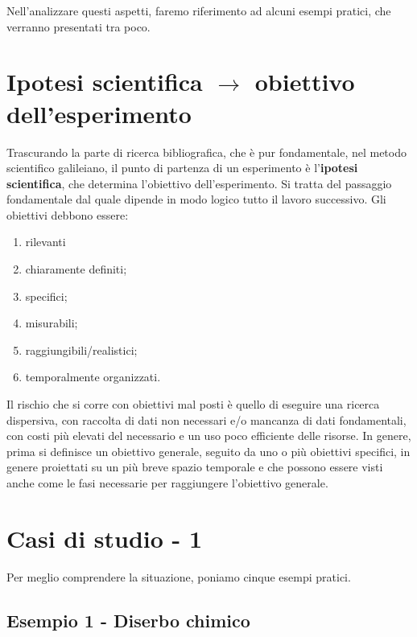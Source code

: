 \documentclass[a4paper,12pt,oneside]{book}
\providecommand{\tightlist}{%
  \setlength{\itemsep}{0pt}\setlength{\parskip}{0pt}}
\theoremstyle{definition}
\theoremstyle{definition}
\theoremstyle{definition}
\theoremstyle{remark}
\begin{document}
Nell'analizzare questi aspetti, faremo riferimento ad alcuni esempi
pratici, che verranno presentati tra poco.

\section{\texorpdfstring{Ipotesi scientifica \(\rightarrow\) obiettivo
dell'esperimento}{Ipotesi scientifica \textbackslash{}rightarrow obiettivo dell'esperimento}}\label{ipotesi-scientifica-rightarrow-obiettivo-dellesperimento}

Trascurando la parte di ricerca bibliografica, che è pur fondamentale,
nel metodo scientifico galileiano, il punto di partenza di un
esperimento è l'\textbf{ipotesi scientifica}, che determina l'obiettivo
dell'esperimento. Si tratta del passaggio fondamentale dal quale dipende
in modo logico tutto il lavoro successivo. Gli obiettivi debbono essere:

\begin{enumerate}
\def\labelenumi{\arabic{enumi}.}
\tightlist
\item
  rilevanti
\item
  chiaramente definiti;
\item
  specifici;
\item
  misurabili;
\item
  raggiungibili/realistici;
\item
  temporalmente organizzati.
\end{enumerate}

Il rischio che si corre con obiettivi mal posti è quello di eseguire una
ricerca dispersiva, con raccolta di dati non necessari e/o mancanza di
dati fondamentali, con costi più elevati del necessario e un uso poco
efficiente delle risorse. In genere, prima si definisce un obiettivo
generale, seguito da uno o più obiettivi specifici, in genere proiettati
su un più breve spazio temporale e che possono essere visti anche come
le fasi necessarie per raggiungere l'obiettivo generale.

\section{Casi di studio - 1}\label{casi-di-studio---1}

Per meglio comprendere la situazione, poniamo cinque esempi pratici.

\subsection{Esempio 1 - Diserbo
chimico}\label{esempio-1---diserbo-chimico}
\end{document}
